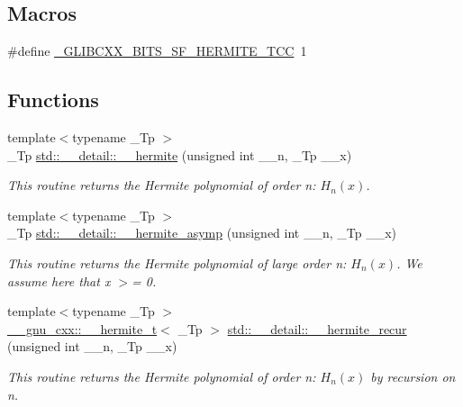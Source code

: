 \subsection*{Macros}
\begin{DoxyCompactItemize}
\item 
\#define \hyperlink{sf__hermite_8tcc_a0f8ec646afa7a1f2821820df783ca594}{\+\_\+\+G\+L\+I\+B\+C\+X\+X\+\_\+\+B\+I\+T\+S\+\_\+\+S\+F\+\_\+\+H\+E\+R\+M\+I\+T\+E\+\_\+\+T\+CC}~1
\end{DoxyCompactItemize}
\subsection*{Functions}
\begin{DoxyCompactItemize}
\item 
{\footnotesize template$<$typename \+\_\+\+Tp $>$ }\\\+\_\+\+Tp \hyperlink{namespacestd_1_1____detail_aeb57881dd224320629e184c9118c910b}{std\+::\+\_\+\+\_\+detail\+::\+\_\+\+\_\+hermite} (unsigned int \+\_\+\+\_\+n, \+\_\+\+Tp \+\_\+\+\_\+x)
\begin{DoxyCompactList}\small\item\em This routine returns the Hermite polynomial of order n\+: $ H_n(x) $. \end{DoxyCompactList}\item 
{\footnotesize template$<$typename \+\_\+\+Tp $>$ }\\\+\_\+\+Tp \hyperlink{namespacestd_1_1____detail_ae44761bc16e62979edeccf4535ec553a}{std\+::\+\_\+\+\_\+detail\+::\+\_\+\+\_\+hermite\+\_\+asymp} (unsigned int \+\_\+\+\_\+n, \+\_\+\+Tp \+\_\+\+\_\+x)
\begin{DoxyCompactList}\small\item\em This routine returns the Hermite polynomial of large order n\+: $ H_n(x) $. We assume here that x $>$= 0. \end{DoxyCompactList}\item 
{\footnotesize template$<$typename \+\_\+\+Tp $>$ }\\\hyperlink{struct____gnu__cxx_1_1____hermite__t}{\+\_\+\+\_\+gnu\+\_\+cxx\+::\+\_\+\+\_\+hermite\+\_\+t}$<$ \+\_\+\+Tp $>$ \hyperlink{namespacestd_1_1____detail_addad9d3f5ca8a7ddae63c9e7c5374e70}{std\+::\+\_\+\+\_\+detail\+::\+\_\+\+\_\+hermite\+\_\+recur} (unsigned int \+\_\+\+\_\+n, \+\_\+\+Tp \+\_\+\+\_\+x)
\begin{DoxyCompactList}\small\item\em This routine returns the Hermite polynomial of order n\+: $ H_n(x) $ by recursion on n. \end{DoxyCompactList}\item 

\end{DoxyCompactItemize}
